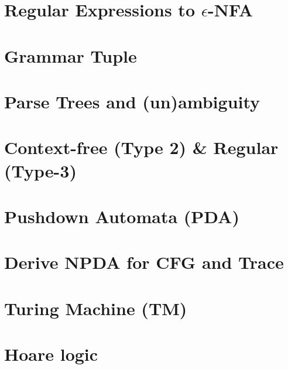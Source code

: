 \documentclass[10pt,a4paper,landscape]{article}
\begin{document}
\begin{multicols*}{3}
\section*{Regular Expressions to $\epsilon$-NFA}
\vspace{-1em}


\section*{Grammar Tuple}
\vspace{-0.3em}


\section*{Parse Trees and (un)ambiguity}
\vspace{-0.3em}


\section*{Context-free (Type 2) \& Regular (Type-3)}
\vspace{-0.6em}


\section*{Pushdown Automata (PDA)}


\section*{Derive NPDA for CFG and Trace}
\vspace{-0.6em}


\section*{Turing Machine (TM)}
\vspace{-0.5em}



\section*{Hoare logic}


\end{multicols*}
\end{document}
